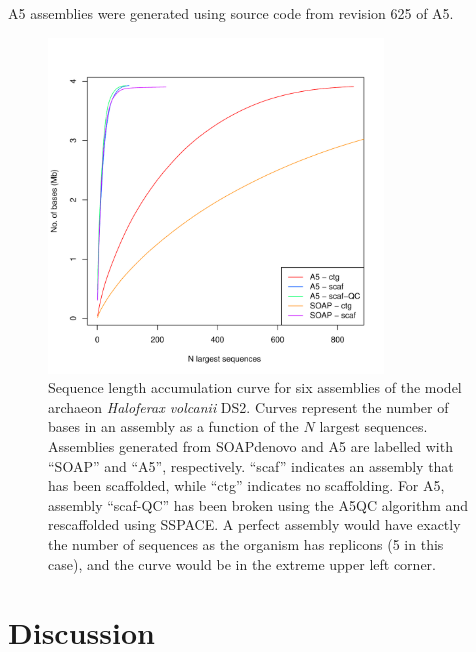 \documentclass{bioinfo}
\begin{document}
A5 assemblies were generated using source code from revision 625 of A5.

\begin{figure}[t]
\includegraphics[width=3.5in]{volc_accum_plot.pdf}
\vspace{-1cm}
\caption{Sequence length accumulation curve for six assemblies of the model archaeon \textit{Haloferax volcanii} DS2. Curves represent the number of bases 
in an assembly as a function of the $N$ largest sequences. Assemblies generated from SOAPdenovo and A5 are labelled with ``SOAP'' and ``A5'', 
respectively. ``scaf'' indicates an assembly that has been scaffolded, while ``ctg'' indicates 
no scaffolding. For A5, assembly ``scaf-QC'' has been broken using the A5QC algorithm and rescaffolded using SSPACE.
A perfect assembly would have exactly the number of sequences as the organism has replicons (5 in this case), and the curve would be
in the extreme upper left corner.}\label{fig:03}
\end{figure}

\section{Discussion}
\end{document}
